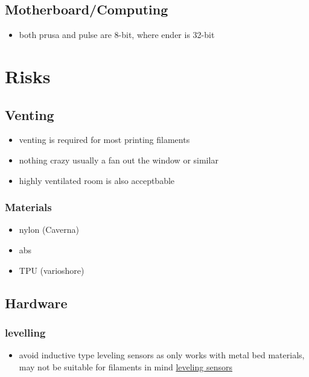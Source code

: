 \documentclass[11pt]{article}
\begin{document}
\subsection{Motherboard/Computing}
\label{sec:org67e9a46}
\begin{itemize}
\item both prusa and pulse are 8-bit, where ender is 32-bit
\end{itemize}

\section{Risks}
\label{sec:org756866d}

\subsection{Venting}
\label{sec:orgb1aadad}
\begin{itemize}
\item venting is required for most printing filaments
\item nothing crazy usually a fan out the window or similar
\item highly ventilated room is also acceptbable
\end{itemize}

\subsubsection{Materials}
\label{sec:org445264a}
\begin{itemize}
\item nylon (Caverna)
\item abs
\item TPU (varioshore)
\end{itemize}

\subsection{Hardware}
\label{sec:orgaf8880c}

\subsubsection{levelling}
\label{sec:orgb1fe14b}
\begin{itemize}
\item avoid inductive type leveling sensors as only works with metal bed materials, may not be suitable for filaments in mind \href{leveling_sensors.org}{leveling sensors}
\end{itemize}
\end{document}
